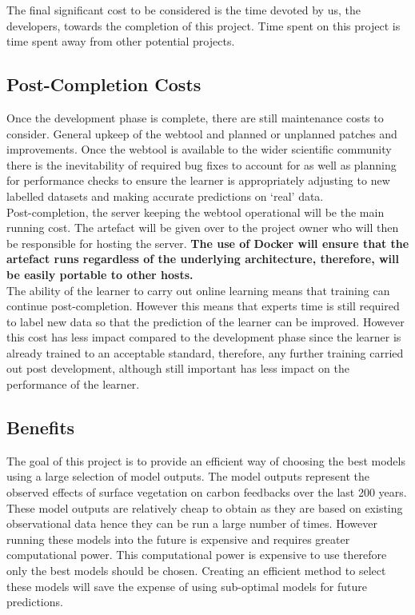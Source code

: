 \documentclass{ecmm427_assignment}
\begin{document}
\quad The final significant cost to be considered is the time devoted by us, the developers, towards the completion of this project. Time spent on this project is time spent away from other potential projects.

\subsection{Post-Completion Costs}
\quad Once the development phase is complete, there are still maintenance costs to consider. General upkeep of the webtool and planned or unplanned patches and improvements. Once the webtool is available to the wider scientific community there is the inevitability of required bug fixes to account for as well as planning for performance checks to ensure the learner is appropriately adjusting to new labelled datasets and making accurate predictions on ‘real’ data.\\

\quad Post-completion, the server keeping the webtool operational will be the main running cost. The artefact will be given over to the project owner who will then be responsible for hosting the server. \textbf{The use of Docker will ensure that the artefact runs regardless of the underlying architecture, therefore, will be easily portable to other hosts.}\\

\quad The ability of the learner to carry out online learning means that training can continue post-completion. However this means that experts time is still required to label new data so that the prediction of the learner can be improved. However this cost has less impact compared to the development phase since the learner is already trained to an acceptable standard, therefore, any further training carried out post development, although still important has less impact on the performance of the learner.\\

\subsection{Benefits}
\quad The goal of this project is to provide an efficient way of choosing the best models using a large selection of model outputs. The model outputs represent the observed effects of surface vegetation on carbon feedbacks over the last 200 years. These model outputs are relatively cheap to obtain as they are based on existing observational data hence they can be run a large number of times. However running these models into the future is expensive and requires greater computational power. This computational power is expensive to use therefore only the best models should be chosen. Creating an efficient method to select these models will save the expense of using sub-optimal models for future predictions.\\
\end{document}
